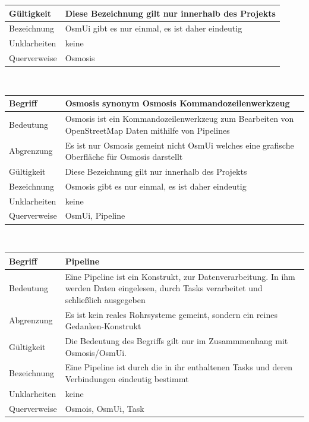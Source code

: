 \documentclass[a4paper,12pt]{scrartcl}
\begin{document}
\begin{center}
\begin{tabular}{|p{5cm}|p{10cm}|}
\hline Gültigkeit & Diese Bezeichnung gilt nur innerhalb des Projekts \\ 
\hline Bezeichnung & OsmUi gibt es nur einmal, es ist daher eindeutig \\ 
\hline Unklarheiten & keine \\ 
\hline Querverweise & Osmosis \\ 
\hline 
\end{tabular}
\vspace{0.7cm}
\\
\begin{tabular}{|p{5cm}|p{10cm}|}
\hline Begriff & \textbf{Osmosis} synonym Osmosis Kommandozeilenwerkzeug\\ 
\hline Bedeutung & Osmosis ist ein Kommandozeilenwerkzeug zum Bearbeiten von OpenStreetMap Daten mithilfe von Pipelines \\ 
\hline Abgrenzung & Es ist nur Osmosis gemeint nicht OsmUi welches eine grafische Oberfläche für Osmosis darstellt\\ 
\hline Gültigkeit & Diese Bezeichnung gilt nur innerhalb des Projekts \\ 
\hline Bezeichnung & Osmosis gibt es nur einmal, es ist daher eindeutig \\ 
\hline Unklarheiten & keine \\ 
\hline Querverweise & OsmUi, Pipeline \\ 
\hline 
\end{tabular}
\vspace{0.7cm}
\\
\begin{tabular}{|p{5cm}|p{10cm}|}
\hline Begriff & \textbf{Pipeline} \\ 
\hline Bedeutung & Eine Pipeline ist ein Konstrukt, zur Datenverarbeitung. In ihm werden Daten eingelesen, durch Tasks verarbeitet und schließlich ausgegeben\\ 
\hline Abgrenzung & Es ist kein reales Rohrsysteme gemeint, sondern ein reines Gedanken-Konstrukt \\ 
\hline Gültigkeit & Die Bedeutung des Begriffs gilt nur im Zusammmenhang mit Osmosis/OsmUi. \\ 
\hline Bezeichnung & Eine Pipeline ist durch die in ihr enthaltenen Tasks und deren Verbindungen eindeutig bestimmt \\ 
\hline Unklarheiten & keine \\ 
\hline Querverweise & Osmois, OsmUi, Task \\ 
\hline 
\end{tabular}

\end{center}
\end{document}
